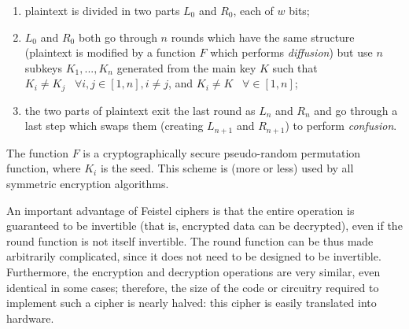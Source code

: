 \begin{enumerate}
    \item plaintext is divided in two parts $L_0$ and $R_0$, each of $w$ bits;
    \item $L_0$ and $R_0$ both go through $n$ rounds which have the same structure (plaintext is modified by a function $F$ which performs \textit{diffusion}) but use $n$ subkeys $K_1, ..., K_n$ generated from the main key $K$ such that $K_i \neq K_j \;\;\; \forall i, j \in [1, n], i \neq j$, and $K_i \neq K \;\;\; \forall \in [1, n]$;
    \item the two parts of plaintext exit the last round as $L_n$ and $R_n$ and go through a last step which swaps them (creating $L_{n+1}$ and $R_{n+1}$) to perform \textit{confusion}.
\end{enumerate}

The function $F$ is a cryptographically secure pseudo-random permutation function, where $K_i$ is the seed. This scheme is (more or less) used by all symmetric encryption algorithms.

An important advantage of Feistel ciphers is that the entire operation is guaranteed to be invertible (that is, encrypted data can be decrypted), even if the round function is not itself invertible. The round function can be thus made arbitrarily complicated, since it does not need to be designed to be invertible. Furthermore, the encryption and decryption operations are very similar, even identical in some cases; therefore, the size of the code or circuitry required to implement such a cipher is nearly halved: this cipher is easily translated into hardware.

